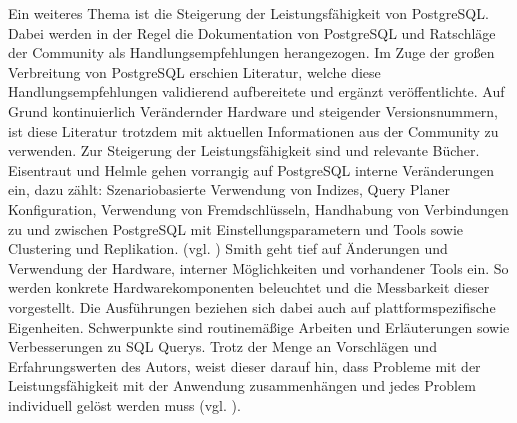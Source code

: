 Ein weiteres Thema ist die Steigerung der Leistungsfähigkeit von PostgreSQL.
Dabei werden in der Regel die Dokumentation von PostgreSQL und Ratschläge der Community als Handlungsempfehlungen herangezogen.
Im Zuge der großen Verbreitung von PostgreSQL erschien Literatur, welche diese Handlungsempfehlungen validierend aufbereitete und ergänzt veröffentlichte.
Auf Grund kontinuierlich Verändernder Hardware und steigender Versionsnummern, ist diese Literatur trotzdem mit aktuellen Informationen aus der Community zu verwenden.
Zur Steigerung der Leistungsfähigkeit sind \cite{book:postgresqladmin} und \cite{book:postgresqlperformance} relevante Bücher.
%
Eisentraut und Helmle gehen vorrangig auf PostgreSQL interne Veränderungen ein, dazu zählt:
Szenariobasierte Verwendung von Indizes, Query Planer Konfiguration, Verwendung von Fremdschlüsseln, Handhabung von Verbindungen zu und zwischen PostgreSQL mit Einstellungsparametern und Tools sowie Clustering und Replikation. (vgl. \cite[S.206 ff.]{book:postgresqladmin})
%
Smith geht tief auf Änderungen und Verwendung der Hardware, interner Möglichkeiten und vorhandener Tools ein.
So werden konkrete Hardwarekomponenten beleuchtet und die Messbarkeit dieser vorgestellt.
Die Ausführungen beziehen sich dabei auch auf plattformspezifische Eigenheiten.
Schwerpunkte sind routinemäßige Arbeiten und Erläuterungen sowie Verbesserungen zu SQL Querys.
Trotz der Menge an Vorschlägen und Erfahrungswerten des Autors, weist dieser darauf hin, dass Probleme mit der Leistungsfähigkeit mit der Anwendung zusammenhängen und jedes Problem individuell gelöst werden muss (vgl. \cite[S.18]{book:postgresqlperformance}).




